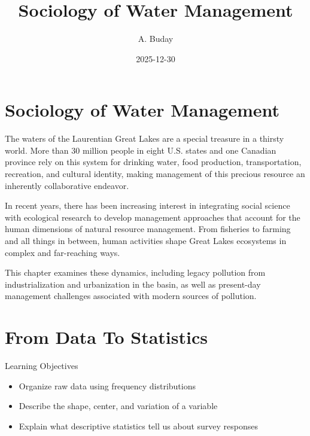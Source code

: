 \documentclass[
  letterpaper,
  DIV=11,
  numbers=noendperiod]{scrreprt}
\title{Sociology of Water Management}
\author{A. Buday}
\date{2025-12-30}
\providecommand{\tightlist}{%
  \setlength{\itemsep}{0pt}\setlength{\parskip}{0pt}}
\renewcommand*\contentsname{Table of contents}
\newcommand\contentsname{Table of contents}
\begin{document}
\maketitle

\renewcommand*\contentsname{Table of contents}
{
\hypersetup{linkcolor=}
\setcounter{tocdepth}{2}
\tableofcontents
}


\chapter{Sociology of Water
Management}\label{sociology-of-water-management}

The waters of the Laurentian Great Lakes are a special treasure in a
thirsty world. More than 30 million people in eight U.S. states and one
Canadian province rely on this system for drinking water, food
production, transportation, recreation, and cultural identity, making
management of this precious resource an inherently collaborative
endeavor.

In recent years, there has been increasing interest in integrating
social science with ecological research to develop management approaches
that account for the human dimensions of natural resource management.
From fisheries to farming and all things in between, human activities
shape Great Lakes ecosystems in complex and far-reaching ways.

This chapter examines these dynamics, including legacy pollution from
industrialization and urbanization in the basin, as well as present-day
management challenges associated with modern sources of pollution.


\chapter{From Data To Statistics}\label{from-data-to-statistics}

Learning Objectives

\begin{itemize}
\tightlist
\item
  Organize raw data using frequency distributions
\item
  Describe the shape, center, and variation of a variable
\item
  Explain what descriptive statistics tell us about survey responses
\end{itemize}
\end{document}
